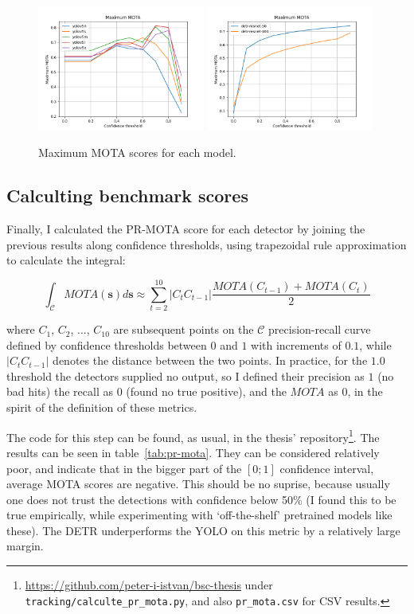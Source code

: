 \begin{figure}[h]
    \includegraphics[width=0.49\textwidth]{figures/yolo_max_mota.png}
    \includegraphics[width=0.49\textwidth]{figures/detr_max_mota.png}
    \caption{Maximum MOTA scores for each model.}
    \label{fig:max-mota}
\end{figure}

\subsection{Calculting benchmark scores}

Finally, I calculated the PR-MOTA score for each detector by joining the previous results along confidence thresholds, using trapezoidal rule approximation to calculate the integral:

\[\int_{\mathcal{C}}{MOTA(\textbf{s})d\textbf{s}} \approx \sum_{t = 2}^{10}{|C_tC_{t-1}|}\frac{MOTA(C_{t-1}) + MOTA(C_t)}{2} \]

where $C_1$, $C_2$, ..., $C_{10}$ are subsequent points on the $\mathcal{C}$ precision-recall curve defined by confidence thresholds between $0$ and $1$ with increments of $0.1$, while $|C_tC_{t-1}|$ denotes the distance between the two points. In practice, for the $1.0$ threshold the detectors supplied no output, so I defined their precision as $1$ (no bad hits) the recall as $0$ (found no true positive), and the $MOTA$ as $0$, in the spirit of the definition of these metrics.

The code for this step can be found, as usual, in the thesis' repository\footnote{\url{https://github.com/peter-i-istvan/bsc-thesis} under \texttt{tracking/calculte\_pr\_mota.py}, and also \texttt{pr\_mota.csv} for CSV results.}. The results can be seen in table~\ref{tab:pr-mota}. They can be considered relatively poor, and indicate that in the bigger part of the $[0;1]$ confidence interval, average MOTA scores are negative. This should be no suprise, because usually one does not trust the detections with confidence below 50\% (I found this to be true empirically, while experimenting with `off-the-shelf' pretrained models like these). The DETR underperforms the YOLO on this metric by a relatively large margin.


